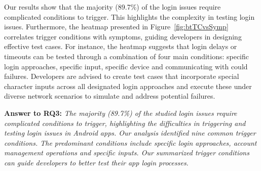 
Our results show that the majority (89.7\%) of the login issues require complicated conditions to trigger.
This highlights the complexity in testing login issues.
Furthermore, the heatmap presented in Figure~\ref{fig:btTCvsSymp} correlates trigger conditions with symptoms, guiding developers in designing effective test cases. For instance, the heatmap suggests that login delays or timeouts can be tested through a combination of four main conditions: specific login approaches, specific input, specific device and communicating with could failures. Developers are advised to create test cases that incorporate special character inputs across all designated login approaches and execute these under diverse network scenarios to simulate and address potential failures.
\begin{tcolorbox}[left=3pt,right=3pt,top=1pt,bottom=1pt]
    \textbf{Answer to RQ3:} \textit{The majority (89.7\%) of the studied login issues require complicated conditions to trigger, highlighting the difficulties in triggering and testing login issues in Android apps. Our analysis identified nine common trigger conditions. The predominant conditions include specific login approaches, account management operations and specific inputs. Our summarized trigger conditions can guide developers to better test their app login processes.
}
\end{tcolorbox}

